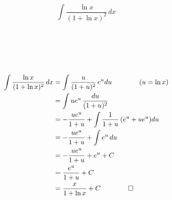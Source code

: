 	$$ \int \frac{\ln x}{(1+\ln x)^2} \,dx$$
	\\
	\\
	\\
	\\
	\\
	\begin{align*}
		\int \frac{\ln x}{(1+\ln x)^2} \,dx 
		&= \int \frac{u}{(1+u)^2} \,e^udu \qquad \qquad (u = \ln x)\\
		&= \int ue^u \,\frac{du}{(1+u)^2} \\
		&= -\frac{ue^u}{1+u} + \int \frac{1}{1+u} \,(e^u+ue^u)du \\
		&= -\frac{ue^u}{1+u} + \int e^u \,du \\
		&= -\frac{ue^u}{1+u} + e^u + C \\
		&=   \frac{e^u}{1+u} + C \\
		&= \frac{x}{1 +\ln x} + C 
		\qquad \qed
	\end{align*}
